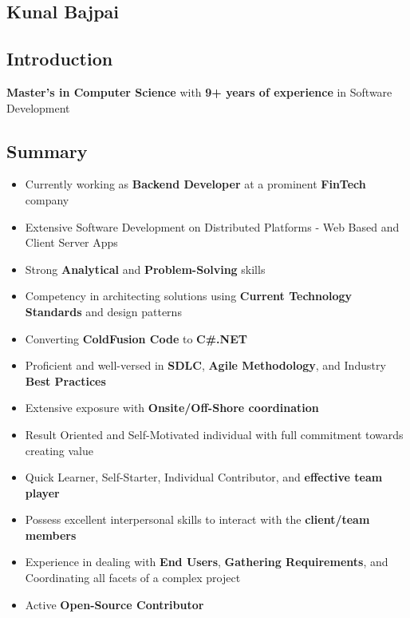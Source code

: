 \documentclass[letterpaper,10pt]{article}
\begin{document}
    \begin{center}
    \section{Kunal Bajpai}
    \end{center}

    \subsection{Introduction}
    \textbf{Master's in Computer Science} with \textbf{9+ years of experience} in Software Development

    \subsection{Summary}
    \begin{itemize}
        \item Currently working as \textbf{Backend Developer} at a prominent \textbf{FinTech} company
        \item Extensive Software Development on Distributed Platforms - Web Based and Client Server Apps
        \item Strong \textbf{Analytical} and \textbf{Problem-Solving} skills
        \item Competency in architecting solutions using \textbf{Current Technology Standards} and design patterns
        \item Converting \textbf{ColdFusion Code} to \textbf{C\#.NET}
        \item Proficient and well-versed in \textbf{SDLC}, \textbf{Agile Methodology}, and Industry \textbf{Best Practices}
        \item Extensive exposure with \textbf{Onsite/Off-Shore coordination}
        \item Result Oriented and Self-Motivated individual with full commitment towards creating value
        \item Quick Learner, Self-Starter, Individual Contributor, and \textbf{effective team player}
        \item Possess excellent interpersonal skills to interact with the \textbf{client/team members}
        \item Experience in dealing with \textbf{End Users}, \textbf{Gathering Requirements}, and Coordinating all facets of a complex project
        \item Active \textbf{Open-Source Contributor}
    \end{itemize}
\end{document}
